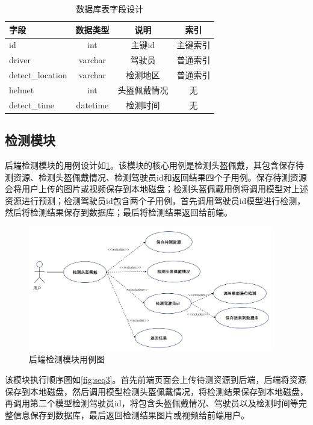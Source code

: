\begin{table}[htbp]
    \centering
    \caption{数据库表字段设计} %
    \label{tab:datatable}
    \begin{tabular}{lccc} %
        \toprule %
        字段 & 数据类型 & 说明 & 索引 \\
        \midrule %
        id & int & 主键id & 主键索引 \\
        driver & varchar & 驾驶员 & 普通索引\\
        detect\_location & varchar & 检测地区 & 普通索引 \\
        helmet & int & 头盔佩戴情况 & 无 \\
        detect\_time & datetime & 检测时间 & 无 \\
        \bottomrule %
    \end{tabular}
\end{table}

\subsection{检测模块}

后端检测模块的用例设计如\ref{fig:uml3}。该模块的核心用例是检测头盔佩戴，其包含保存待测资源、检测头盔佩戴情况、检测驾驶员id和返回结果四个子用例。保存待测资源会将用户上传的图片或视频保存到本地磁盘；检测头盔佩戴用例将调用模型对上述资源进行预测；检测驾驶员id包含两个子用例，首先调用驾驶员id模型进行检测，然后将检测结果保存到数据库；最后将检测结果返回给前端。
\begin{figure}[!htb]
    \centering
    \includegraphics[width=0.95\textwidth]{figs/chap05/uml3.png}
    \caption{后端检测模块用例图}
    \label{fig:uml3}
\end{figure}

该模块执行顺序图如\ref{fig:seq3}。首先前端页面会上传待测资源到后端，后端将资源保存到本地磁盘，然后调用模型检测头盔佩戴情况，将检测结果保存到本地磁盘，再调用第二个模型检测驾驶员id，将包含头盔佩戴情况、驾驶员以及检测时间等完整信息保存到数据库，最后返回检测结果图片或视频给前端用户。

